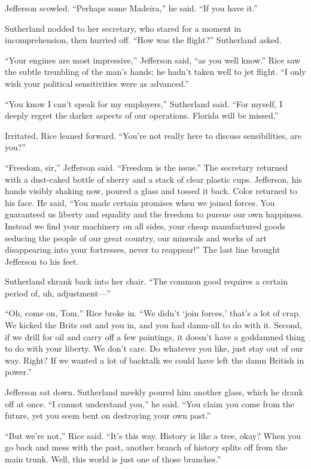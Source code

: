 Jefferson scowled. “Perhaps some Madeira,” he said. “If you have it.”

Sutherland nodded to her secretary, who stared for a moment in incomprehension, then hurried off. “How was the flight?” Sutherland asked.

“Your engines are most impressive,” Jefferson said, “as you well know.” Rice saw the subtle trembling of the man’s hands; he hadn’t taken well to jet flight. “I only wish your political sensitivities were as advanced.”

“You know I can’t speak for my employers,” Sutherland said. “For myself, I deeply regret the darker aspects of our operations. Florida will be missed.”

Irritated, Rice leaned forward. “You’re not really here to discuss sensibilities, are you?”

“Freedom, sir,” Jefferson said. “Freedom is the issue.” The secretary returned with a dust-caked bottle of sherry and a stack of clear plastic cups. Jefferson, his hands visibly shaking now, poured a glass and tossed it back. Color returned to his face. He said, “You made certain promises when we joined forces. You guaranteed us liberty and equality and the freedom to pursue our own happiness. Instead we find your machinery on all sides, your cheap manufactured goods seducing the people of our great country, our minerals and works of art disappearing into your fortresses, never to reappear!” The last line brought Jefferson to his feet.

Sutherland shrank back into her chair. “The common good requires a certain period of, uh, adjustment—”

“Oh, come on, Tom,” Rice broke in. “We didn’t ‘join forces,’ that’s a lot of crap. We kicked the Brits out and you in, and you had damn-all to do with it. Second, if we drill for oil and carry off a few paintings, it doesn’t have a goddamned thing to do with your liberty. We don’t care. Do whatever you like, just stay out of our way. Right? If we wanted a lot of backtalk we could have left the damn British in power.”

Jefferson sat down. Sutherland meekly poured him another glass, which he drank off at once. “I cannot understand you,” he said. “You claim you come from the future, yet you seem bent on destroying your own past.”

“But we’re not,” Rice said. “It’s this way. History is like a tree, okay? When you go back and mess with the past, another branch of history splits off from the main trunk. Well, this world is just one of those branches.”

